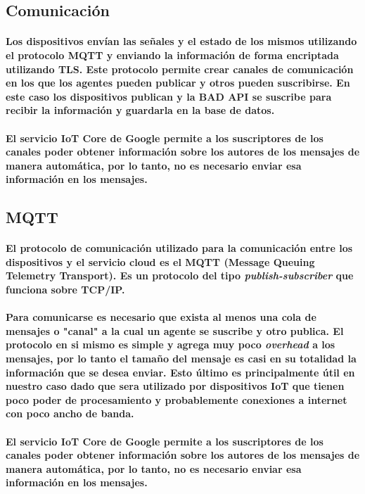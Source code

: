 \documentclass{article}
\begin{document}
\subsection{Comunicación}
\paragraph{
Los dispositivos envían las señales y el estado de los mismos utilizando el protocolo MQTT y enviando la información de forma encriptada utilizando TLS. Este protocolo permite crear canales de comunicación en los que los agentes pueden publicar y otros pueden suscribirse. En este caso los dispositivos publican y la BAD API se suscribe para recibir la información y guardarla en la base de datos.
}
\paragraph{
El servicio IoT Core de Google permite a los suscriptores de los canales poder obtener información sobre los autores de los mensajes de manera automática, por lo tanto, no es necesario enviar esa información en los mensajes.
}

\subsection{MQTT}
\paragraph{
El protocolo de comunicación utilizado para la comunicación entre los dispositivos y el servicio cloud es el MQTT (Message Queuing Telemetry Transport). Es un protocolo del tipo \textit{publish-subscriber} que funciona sobre TCP/IP.
}
\paragraph{
Para comunicarse es necesario que exista al menos una cola de mensajes o "canal" a la cual un agente se suscribe y otro publica. El protocolo en si mismo es simple y agrega muy poco \textit{overhead} a los mensajes, por lo tanto el tamaño del mensaje es casi en su totalidad la información que se desea enviar. Esto último es principalmente útil en nuestro caso dado que sera utilizado por dispositivos IoT que tienen poco poder de procesamiento y probablemente conexiones a internet con poco ancho de banda.
}
\paragraph{
El servicio IoT Core de Google permite a los suscriptores de los canales poder obtener información sobre los autores de los mensajes de manera automática, por lo tanto, no es necesario enviar esa información en los mensajes.
}
\end{document}
